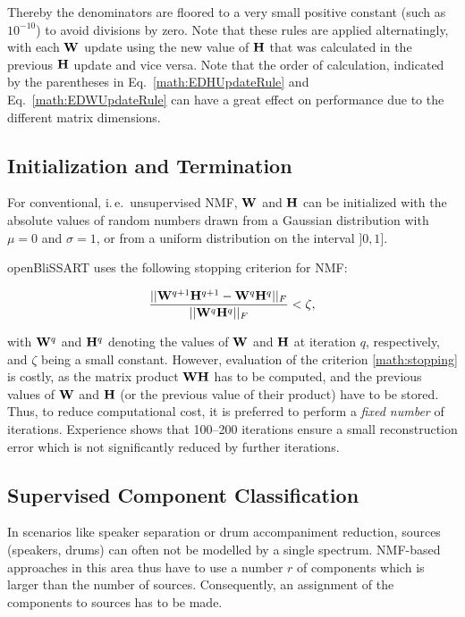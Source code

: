 Thereby the denominators are floored to a very small positive constant (such as
$10^{-10}$) to avoid divisions by zero. Note that these rules are applied
alternatingly, with each $\mathbf{W}$ update using the new value of $\mathbf{H}$ that
was calculated in the previous $\mathbf{H}$ update and vice versa. Note that the
order of calculation, indicated by the parentheses in
Eq.~\ref{math:EDHUpdateRule} and Eq.~\ref{math:EDWUpdateRule} can have a great
effect on performance due to the different matrix dimensions.


\subsection{Initialization and Termination}

For conventional, i.\,e.\ unsupervised NMF, $\mathbf{W}$ and $\mathbf{H}$ can be initialized with the absolute values of random numbers drawn from a
Gaussian distribution with $\mu = 0$ and $\sigma = 1$, or from a uniform distribution on the interval $]0,1]$. 

openBliSSART uses the following stopping criterion for NMF:

\begin{equation}
    \label{math:stopping}
    \frac{||\mathbf{W}^{q+1}\mathbf{H}^{q+1} - \mathbf{W}^{q}\mathbf{H}^{q}||_F}
         {||\mathbf{W}^{q}\mathbf{H}^{q}||_F}
    < \zeta ,
\end{equation}

\noindent with $\mathbf{W}^q$ and $\mathbf{H}^q$ denoting the values of $\mathbf{W}$ and
$\mathbf{H}$ at iteration $q$, respectively, and $\zeta$ being a small constant.
However, evaluation of the criterion \ref{math:stopping} is costly, as the
matrix product $\mathbf{WH}$ has to be computed, and the previous values of
$\mathbf{W}$ and $\mathbf{H}$ (or the previous value of their product) have to be
stored. Thus, to reduce computational cost, it is preferred to perform a \emph{fixed
number} of iterations. Experience shows that 100--200 iterations ensure a small
reconstruction error which is not significantly reduced by further iterations.


\subsection{Supervised Component Classification}

\label{sec:nmfbss}

In scenarios like speaker separation or drum accompaniment reduction, sources
(speakers, drums) can often not be modelled by a single spectrum. NMF-based
approaches in this area thus have to use a number $r$ of components which is
larger than the number of sources. Consequently, an assignment of the
components to sources has to be made.

